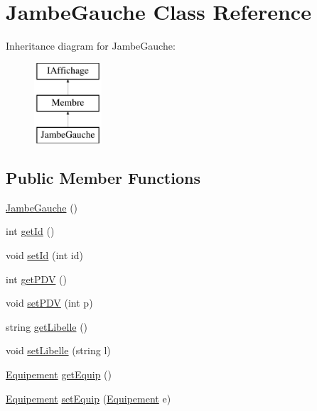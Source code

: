\hypertarget{class_jambe_gauche}{\section{\-Jambe\-Gauche \-Class \-Reference}
\label{class_jambe_gauche}
}
\-Inheritance diagram for \-Jambe\-Gauche\-:\begin{figure}[H]
\begin{center}
\leavevmode
\includegraphics[height=3.000000cm]{class_jambe_gauche}
\end{center}
\end{figure}
\subsection*{\-Public \-Member \-Functions}
\begin{DoxyCompactItemize}
\item 
\hyperlink{class_jambe_gauche_a306ff75914909ceccf6bb47a6f00aa34}{\-Jambe\-Gauche} ()
\item 
int \hyperlink{class_jambe_gauche_a45630c5110de97c6178e23291aa547f0}{get\-Id} ()
\item 
void \hyperlink{class_jambe_gauche_a2851cb622f0d958c2795bcfe45904209}{set\-Id} (int id)
\item 
int \hyperlink{class_jambe_gauche_a0012a7b60f3aa32e26dd59f88f7f046f}{get\-P\-D\-V} ()
\item 
void \hyperlink{class_jambe_gauche_af6fc1b58e9f6dd1eeb840c71d1908043}{set\-P\-D\-V} (int p)
\item 
string \hyperlink{class_jambe_gauche_ab6cacd327fa0c3a9a6084d4d1c52ad51}{get\-Libelle} ()
\item 
void \hyperlink{class_jambe_gauche_a5ce53b166f79dbfb157ccc2774dcdbfd}{set\-Libelle} (string l)
\item 
\hyperlink{class_equipement}{\-Equipement} \hyperlink{class_jambe_gauche_a050999bb1256f3d409c5708be152344a}{get\-Equip} ()
\item 
\hyperlink{class_equipement}{\-Equipement} \hyperlink{class_jambe_gauche_a6192a0c9850adebf39f9ef14344a8957}{set\-Equip} (\hyperlink{class_equipement}{\-Equipement} e)
\end{DoxyCompactItemize}


